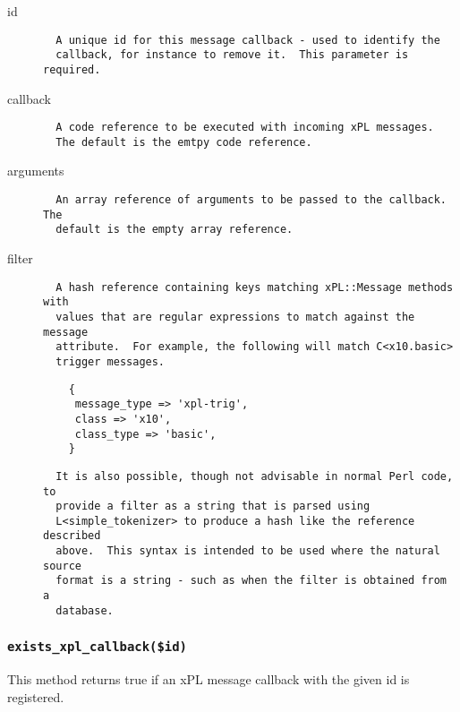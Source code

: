\documentclass[12pt,a4paper]{article}
\begin{document}
\begin{description}

\item[{id}] \mbox{}\begin{verbatim}
  A unique id for this message callback - used to identify the
  callback, for instance to remove it.  This parameter is required.
\end{verbatim}

\item[{callback}] \mbox{}\begin{verbatim}
  A code reference to be executed with incoming xPL messages.
  The default is the emtpy code reference.
\end{verbatim}

\item[{arguments}] \mbox{}\begin{verbatim}
  An array reference of arguments to be passed to the callback.  The
  default is the empty array reference.
\end{verbatim}

\item[{filter}] \mbox{}\begin{verbatim}
  A hash reference containing keys matching xPL::Message methods with
  values that are regular expressions to match against the message
  attribute.  For example, the following will match C<x10.basic>
  trigger messages.
\end{verbatim}
\begin{verbatim}
    {
     message_type => 'xpl-trig',
     class => 'x10',
     class_type => 'basic',
    }
\end{verbatim}
\begin{verbatim}
  It is also possible, though not advisable in normal Perl code, to
  provide a filter as a string that is parsed using
  L<simple_tokenizer> to produce a hash like the reference described
  above.  This syntax is intended to be used where the natural source
  format is a string - such as when the filter is obtained from a
  database.
\end{verbatim}
\end{description}
\subsubsection*{\texttt{exists\_xpl\_callback(\$id)}\label{xPL::Listener_exists_xpl_callback_id_}}


This method returns true if an xPL message callback with the given id
is registered.
\end{document}
